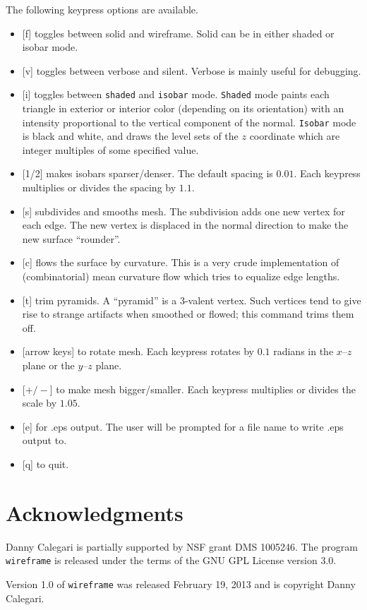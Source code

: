 \documentclass[12pt]{article}
\begin{document}
The following keypress options are available.

\begin{itemize}
\item{[f] toggles between solid and wireframe. Solid can be in either shaded or isobar mode.}
\item{[v] toggles between verbose and silent. Verbose is mainly useful for debugging.}
\item{[i] toggles between {\tt shaded} and {\tt isobar} mode. {\tt Shaded} mode paints each triangle in 
exterior or interior color (depending on its orientation) with an intensity proportional to the
vertical component of the normal. {\tt Isobar} mode is black and white, and draws the level
sets of the $z$ coordinate which are integer multiples of some specified value.}
\item{[1/2] makes isobars sparser/denser. The default spacing is $0.01$. Each keypress multiplies
or divides the spacing by $1.1$.}
\item{[s] subdivides and smooths mesh. The subdivision adds one new vertex for each edge. The new vertex
is displaced in the normal direction to make the new surface ``rounder''.}
\item{[c] flows the surface by curvature. This is a very crude implementation of (combinatorial) mean
curvature flow which tries to equalize edge lengths.}
\item{[t] trim pyramids. A ``pyramid'' is a 3-valent vertex. Such vertices tend to give rise to
strange artifacts when smoothed or flowed; this command trims them off.}
\item{[arrow keys] to rotate mesh. Each keypress rotates by $0.1$ radians in the $x$--$z$ plane or
the $y$--$z$ plane.}
\item{[$+/-$] to make mesh bigger/smaller. Each keypress multiplies or divides the scale by $1.05$.}
\item{[e] for .eps output. The user will be prompted for a file name to write .eps output to.}
\item{[q] to quit.}
\end{itemize}

\section{Acknowledgments}
Danny Calegari is partially supported by NSF grant DMS 1005246. The program {\tt wireframe} is
released under the terms of the GNU GPL License version 3.0.

\medskip

\noindent Version 1.0 of {\tt wireframe} was released February 19, 2013 and is copyright Danny Calegari.
\end{document}
